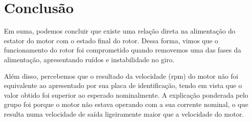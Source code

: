 \documentclass[a4paper,12pt,oneside]{article}
\begin{document}
\newpage
\section{Conclusão}\hspace{0cm}

Em suma, podemos concluir que existe uma relação direta na alimentação do estator do motor com o estado final do rotor. Dessa forma, vimos que o funcionamento do rotor foi comprometido quando removemos uma das fases da alimentação, apresentando ruídos e instabilidade no giro. 

Além disso, percebemos que o resultado da velocidade (rpm) do motor não foi equivalente ao apresentado por sua placa de identificação, tendo em vista que o valor obtido foi superior ao esperado nominalmente. A explicação ponderada pelo grupo foi porque o motor não estava operando com a sua corrente nominal, o que resulta numa velocidade de saída ligeiramente maior que a velocidade do motor.




\newpage
{}


\end{document}
